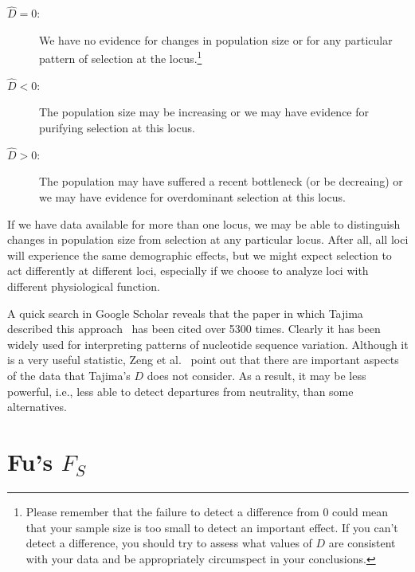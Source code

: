 \documentclass[12pt]{article}
\begin{document}
\begin{description}

\item[$\hat D = 0$:] We have no evidence for changes in population
  size or for any particular pattern of selection at the
  locus.\footnote{Please remember that the failure to detect a difference
    from 0 could mean that your sample size is too small to detect an
    important effect. If you can't detect a difference, you should try
    to assess what values of $D$ are consistent with your data and be
    appropriately circumspect in your conclusions.}

\item[$\hat D < 0$:] The population size may be increasing or we may
  have evidence for purifying selection at this locus.

\item[$\hat D > 0$:] The population may have suffered a recent
  bottleneck (or be decreaing) or we may have evidence for
  overdominant selection at this locus.

\end{description}

\noindent If we have data available for more than one locus, we may be
able to distinguish changes in population size from selection at any
particular locus. After all, all loci will experience the same
demographic effects, but we might expect selection to act differently
at different loci, especially if we choose to analyze loci with
different physiological function.

A quick search in Google Scholar reveals that the paper in which
Tajima described this approach~\cite{Tajima89} has been cited over
5300 times. Clearly it has been widely used for interpreting patterns
of nucleotide sequence variation. Although it is a very useful
statistic, Zeng et al.~\cite{Zeng-etal-2006} point out that there are
important aspects of the data that Tajima's $D$ does not consider. As
a result, it may be less powerful, i.e., less able to detect
departures from neutrality, than some alternatives.

\section*{Fu's $F_S$}
\end{document}
